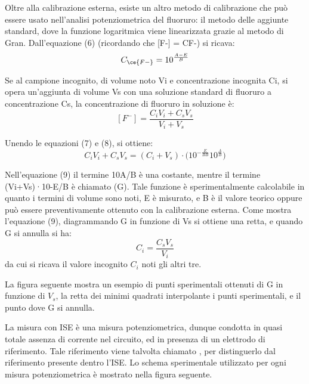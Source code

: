 Oltre alla calibrazione esterna, esiste un altro metodo di calibrazione che può essere usato nell'analisi potenziometrica del fluoruro: il metodo delle aggiunte standard, dove la funzione logaritmica viene linearizzata grazie al metodo di Gran. Dall'equazione (6) (ricordando che [F-] = CF-) si ricava:
\begin{equation} \label{eq:laboratorio:7}
C_{\ce{F-}} = 10^{\frac{A-E}{B}}
\end{equation}

Se al campione incognito, di volume noto Vi e concentrazione incognita Ci, si opera un'aggiunta di volume Vs con una soluzione standard di fluoruro a concentrazione Cs, la concentrazione di fluoruro in soluzione è:
\begin{equation} \label{eq:laboratorio:8}
[F^-] = \frac{C_i V_i + C_s V_s}{V_i + V_s}
\end{equation}


Unendo le equazioni (7) e (8), si ottiene:
\begin{equation} \label{eq:laboratorio:9}
C_i V_i + C_s V_s = (C_i + V_s) \cdot \biggl(10^{-\frac{E}{BB}} 10^{\frac{A}{B}}\biggr)
\end{equation}

Nell'equazione (9) il termine 10A/B è una costante, mentre il termine (Vi+Vs)·10-E/B è chiamato  (G). Tale funzione è sperimentalmente calcolabile in quanto i termini di volume sono noti, E è misurato, e B è il valore teorico oppure può essere preventivamente ottenuto con la calibrazione esterna. Come mostra l'equazione (9), diagrammando G in funzione di Vs si ottiene una retta, e quando G si annulla si ha:
\begin{equation} \label{eq:laboratorio:10}
C_i = \frac{C_s V_s}{V_i}
\end{equation}
da cui si ricava il valore incognito $C_i$ noti gli altri tre.

La figura seguente mostra un esempio di punti sperimentali ottenuti di G in funzione di $V_s$, la retta dei minimi quadrati interpolante i punti sperimentali, e il punto dove G si annulla.

La misura con ISE è una misura potenziometrica, dunque condotta in quasi totale assenza di corrente nel circuito, ed in presenza di un elettrodo di riferimento. Tale riferimento viene talvolta chiamato , per distinguerlo dal riferimento  presente dentro l'ISE. Lo schema sperimentale utilizzato per ogni misura potenziometrica è mostrato nella figura seguente.

